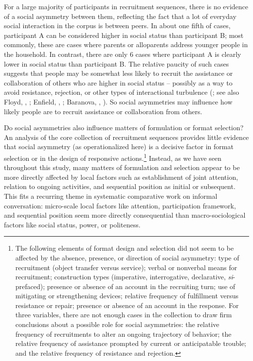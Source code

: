 \documentclass[output=paper]{langsci/langscibook}
\begin{document}
For a large majority of participants in recruitment sequences, there is no evidence of a social asymmetry between them, reflecting the fact that a lot of everyday social interaction in the corpus is between peers. In about one fifth of cases, participant A can be considered higher in social status than participant B; most commonly, these are cases where parents or alloparents address younger people in the household. In contrast, there are only 6 cases where participant A is clearly lower in social status than participant B. The relative paucity of such cases suggests that people may be somewhat less likely to recruit the assistance or collaboration of others who are higher in social status -- possibly as a way to avoid resistance, rejection, or other types of interactional turbulence (\citealt{brown_universals_1978}; see also Floyd, , ; Enfield, , ; Baranova, , ). So social asymmetries may influence how likely people are to recruit assistance or collaboration from others.

Do social asymmetries also influence matters of formulation or format selection? An analysis of the core collection of recruitment sequences provides little evidence that social asymmetry (as operationalized here) is a decisive factor in format selection or in the design of responsive actions.\footnote{The following elements of format design and selection did not seem to be affected by the absence, presence, or direction of social asymmetry: type of recruitment (object transfer versus service); verbal or nonverbal means for recruitment; construction types (imperative, interrogative, declarative, \textit{si}-prefaced); presence or absence of an account in the recruiting turn; use of mitigating or strengthening devices; relative frequency of fulfillment versus resistance or repair; presence or absence of an account in the response. For three variables, there are not enough cases in the collection to draw firm conclusions about a possible role for social asymmetries: the relative frequency of recruitments to alter an ongoing trajectory of behavior; the relative frequency of assistance prompted by current or anticipatable trouble; and the relative frequency of resistance and rejection.} Instead, as we have seen throughout this study, many matters of formulation and selection appear to be more directly affected by local factors such as establishment of joint attention, relation to ongoing activities, and sequential position as initial or subsequent. This fits a recurring theme in systematic comparative work on informal conversation: micro-scale local factors like attention, participation framework, and sequential position seem more directly consequential than macro-sociological factors like social status, power, or politeness.
\end{document}
